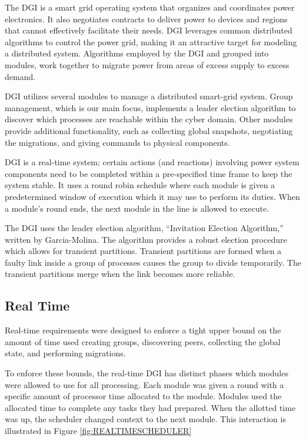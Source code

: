 The DGI is a smart grid operating system that organizes and coordinates power electronics.
It also negotiates contracts to deliver power to devices and regions that cannot effectively facilitate their needs.
DGI leverages common distributed algorithms to control the power grid, making it an attractive target for modeling a distributed system.
Algorithms employed by the \ac{DGI} and grouped into modules, work together to migrate power from areas of excess supply to excess demand.

DGI utilizes several modules to manage a distributed smart-grid system.
Group management, which is our main focus, implements a leader election algorithm to discover which processes are reachable within the cyber domain.
Other modules provide additional functionality, such as collecting global snapshots, negotiating the migrations, and giving commands to physical components.

DGI is a real-time system; certain actions (and reactions) involving power system components need to be completed within a pre-specified time frame to keep the system stable.
It uses a round robin schedule where each module is given a predetermined window of execution which it may use to perform its duties.
When a module's round ends, the next module in the line is allowed to execute. 

The DGI uses the leader election algorithm, ``Invitation Election Algorithm,'' written by Garcia-Molina\cite{INVITATIONELECTION}.
The algorithm provides a robust election procedure which allows for transient partitions.
Transient partitions are formed when a faulty link inside a group of processes causes the group to divide temporarily.
The transient partitions merge when the link becomes more reliable.

\subsection{Real Time}
Real-time requirements were designed to enforce a tight upper bound on the amount of time used creating groups, discovering peers, collecting the global state, and performing migrations.

To enforce these bounds, the real-time DGI has distinct phases which modules were allowed to use for all processing.
Each module was given a round with a specific amount of processor time allocated to the module.
Modules used the allocated time to complete any tasks they had prepared.
When the allotted time was up, the scheduler changed context to the next module.
This interaction is illustrated in Figure \ref{fig:REALTIMESCHEDULER}

